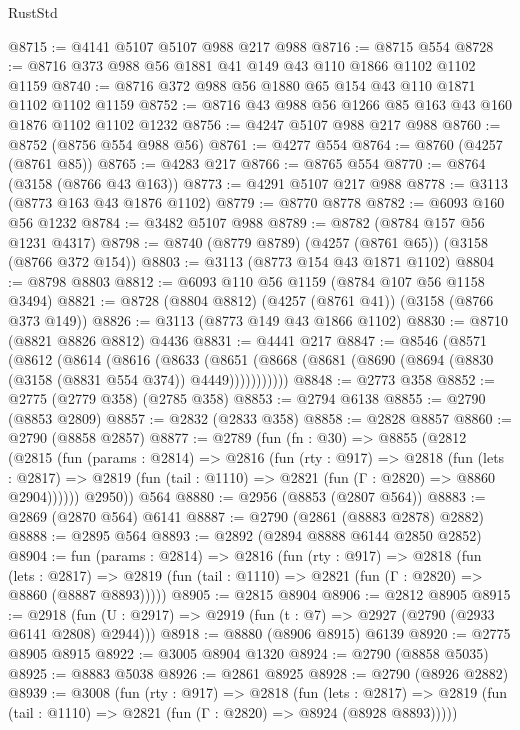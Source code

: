 \begin{lexlean}{RustStd}
\begin{coremodule}
{\begin{coremodule}
{{{{{{{{{{{{{{{{{{{{{{{{{{@8715 := @4141 @5107 @5107 @988 @217 @988
@8716 := @8715 @554
@8728 := @8716 @373 @988 @56 @1881 @41 @149 @43 @110 @1866 @1102 @1102 @1159
@8740 := @8716 @372 @988 @56 @1880 @65 @154 @43 @110 @1871 @1102 @1102 @1159
@8752 := @8716 @43 @988 @56 @1266 @85 @163 @43 @160 @1876 @1102 @1102 @1232
@8756 := @4247 @5107 @988 @217 @988
@8760 := @8752 (@8756 @554 @988 @56)
@8761 := @4277 @554
@8764 := @8760 (@4257 (@8761 @85))
@8765 := @4283 @217
@8766 := @8765 @554
@8770 := @8764 (@3158 (@8766 @43 @163))
@8773 := @4291 @5107 @217 @988
@8778 := @3113 (@8773 @163 @43 @1876 @1102)
@8779 := @8770 @8778
@8782 := @6093 @160 @56 @1232
@8784 := @3482 @5107 @988
@8789 := @8782 (@8784 @157 @56 @1231 @4317)
@8798 := @8740 (@8779 @8789) (@4257 (@8761 @65)) (@3158 (@8766 @372 @154))
@8803 := @3113 (@8773 @154 @43 @1871 @1102)
@8804 := @8798 @8803
@8812 := @6093 @110 @56 @1159 (@8784 @107 @56 @1158 @3494)
@8821 := @8728 (@8804 @8812) (@4257 (@8761 @41)) (@3158 (@8766 @373 @149))
@8826 := @3113 (@8773 @149 @43 @1866 @1102)
@8830 := @8710 (@8821 @8826 @8812) @4436
@8831 := @4441 @217
@8847 := @8546
    (@8571
      (@8612
        (@8614
          (@8616
            (@8633
              (@8651 (@8668 (@8681 (@8690 (@8694 (@8830 (@3158 (@8831 @554 @374)) @4449)))))))))))
@8848 := @2773 @358
@8852 := @2775 (@2779 @358) (@2785 @358)
@8853 := @2794 @6138
@8855 := @2790 (@8853 @2809)
@8857 := @2832 (@2833 @358)
@8858 := @2828 @8857
@8860 := @2790 (@8858 @2857)
@8877 := @2789
    (fun (fn : @30) =>
    @8855
      (@2812
        (@2815
          (fun (params : @2814) =>
          @2816
            (fun (rty : @917) =>
            @2818
              (fun (lets : @2817) =>
              @2819 (fun (tail : @1110) => @2821 (fun (Γ : @2820) => @8860 @2904))))))
        @2950))
    @564
@8880 := @2956 (@8853 (@2807 @564))
@8883 := @2869 (@2870 @564) @6141
@8887 := @2790 (@2861 (@8883 @2878) @2882)
@8888 := @2895 @564
@8893 := @2892 (@2894 @8888 @6144 @2850 @2852)
@8904 := fun (params : @2814) =>
  @2816
    (fun (rty : @917) =>
    @2818
      (fun (lets : @2817) =>
      @2819 (fun (tail : @1110) => @2821 (fun (Γ : @2820) => @8860 (@8887 @8893)))))
@8905 := @2815 @8904
@8906 := @2812 @8905
@8915 := @2918 (fun (U : @2917) => @2919 (fun (t : @7) => @2927 (@2790 (@2933 @6141 @2808) @2944)))
@8918 := @8880 (@8906 @8915) @6139
@8920 := @2775 @8905 @8915
@8922 := @3005 @8904 @1320
@8924 := @2790 (@8858 @5035)
@8925 := @8883 @5038
@8926 := @2861 @8925
@8928 := @2790 (@8926 @2882)
@8939 := @3008
    (fun (rty : @917) =>
    @2818
      (fun (lets : @2817) =>
      @2819 (fun (tail : @1110) => @2821 (fun (Γ : @2820) => @8924 (@8928 @8893)))))
}}}}}}}}}}}}}}}}}}}}}}}}}}
\end{coremodule}}
\end{coremodule}
\end{lexlean}
